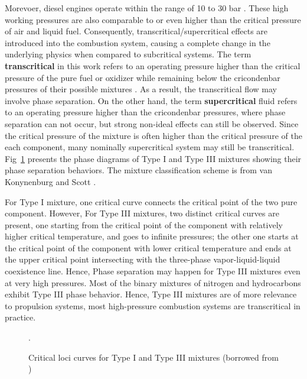 Morevoer, diesel engines operate within the range of 10 to 30 bar \cite{jofre2021transcritical}. These high working pressures are also comparable to or even higher than the critical pressure of air and liquid fuel. Consequently, transcritical/supercritical effects are introduced into the combustion system, causing a complete change in the underlying physics when compared to subcritical systems. The term \textbf{transcritical} in this work refers to an operating pressure higher than the critical pressure of the pure fuel or oxidizer while remaining below the cricondenbar pressures of their possible mixtures \cite{fathi2022large}. As a result, the transcritical flow may involve phase separation. On the other hand, the term \textbf{supercritical} fluid refers to an operating pressure higher than the cricondenbar pressures, where phase separation can not occur, but strong non-ideal effects can still be observed. Since the critical pressure of the mixture is often higher than the critical pressure of the each component, many nominally supercritical system may still be transcritical. Fig~\ref{Intro_critical_loci} presents the phase diagrams of Type I and Type III mixtures showing their phase separation behaviors. The mixture classification scheme is from van Konynenburg and Scott \cite{van1980critical}. 

For Type I mixture, one critical curve connects the critical point of the two pure component. However, For Type III mixtures, two distinct critical curves are present, one starting from the critical point  of the component with relatively higher critical temperature, and goes to infinite pressures; the other one starts at the critical point of the component with lower critical temperature and ends at the upper critical point intersecting with the three-phase vapor-liquid-liquid coexistence line. Hence, Phase separation may happen for Type III mixtures even at very high pressures. Most of the binary mixtures of nitrogen and hydrocarbons exhibit Type III phase behavior. Hence, Type III mixtures are of more relevance to propulsion systems, most high-pressure combustion systems are transcritical in practice.  



\begin{figure}[htb]
    \centering
    \caption{Critical loci curves for Type I and Type III mixtures (borrowed from \cite{qiu2015investigation})} \label{Intro_critical_loci}. 
\end{figure}



